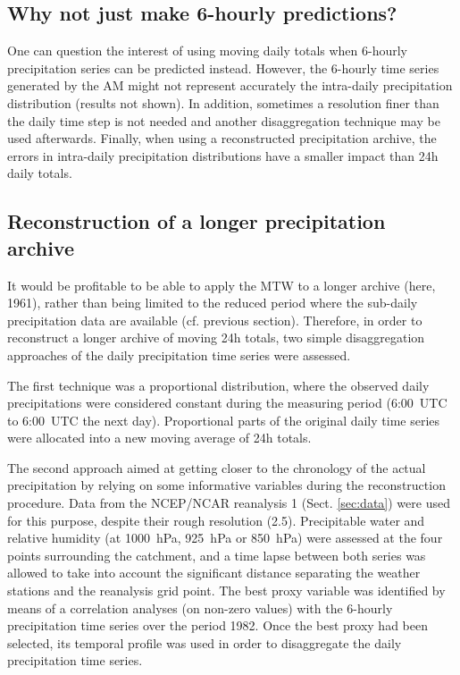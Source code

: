 \documentclass[hess, manuscript]{copernicus}
\begin{document}
	
	\subsection{Why not just make 6-hourly predictions?}
	
	One can question the interest of using moving daily totals when 6-hourly precipitation series can be predicted instead. However, the 6-hourly time series generated by the AM might not represent accurately the intra-daily precipitation distribution (results not shown). In addition, sometimes a resolution finer than the daily time step is not needed and another disaggregation technique may be used afterwards. Finally, when using a reconstructed precipitation archive, the errors in intra-daily precipitation distributions have a smaller impact than 24h daily totals.
	
	

	\subsection{Reconstruction of a longer precipitation archive}
	\label{sec:reconstruction}
	
	It would be profitable to be able to apply the MTW to a longer archive (here, 1961), rather than being limited to the reduced period where the sub-daily precipitation data are available (cf. previous section). Therefore, in order to reconstruct a longer archive of moving 24h totals, two simple disaggregation approaches of the daily precipitation time series were assessed.
	
	The first technique was a proportional distribution, where the observed daily precipitations were considered constant during the measuring period (6:00~UTC to 6:00~UTC the next day). Proportional parts of the original daily time series were allocated into a new moving average of 24h totals. 
	
	The second approach aimed at getting closer to the chronology of the actual precipitation by relying on some informative variables during the reconstruction procedure. Data from the NCEP/NCAR reanalysis 1 (Sect. \ref{sec:data}) were used for this purpose, despite their rough resolution (2.5\textdegree). Precipitable water and relative humidity (at 1000~hPa, 925~hPa or 850~hPa) were assessed at the four points surrounding the catchment, and a time lapse between both series was allowed to take into account the significant distance separating the weather stations and the reanalysis grid point. The best proxy variable was identified by means of a correlation analyses (on non-zero values) with the 6-hourly precipitation time series over the period 1982. Once the best proxy had been selected, its temporal profile was used in order to disaggregate the daily precipitation time series.
\end{document}

